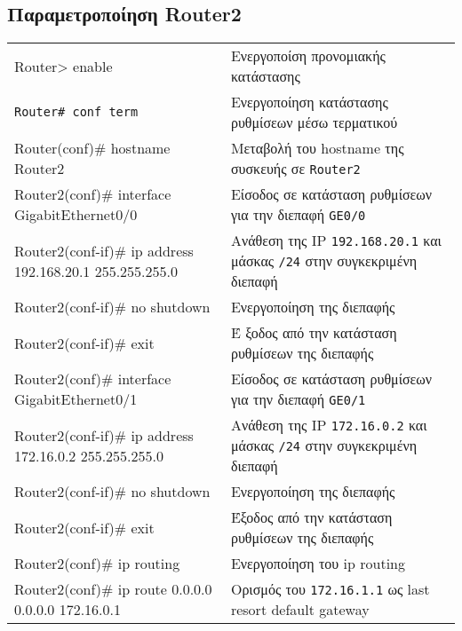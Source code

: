 \documentclass{EdipyLabsSolutions}
\begin{document}
\subsection*{Παραμετροποίηση Router2}
\begin{tabular}{>{\ttfamily}m{12cm}m{7cm}}
	Router> enable &Ενεργοποίση προνομιακής κατάστασης \\[0.25cm]
	\texttt{Router\# conf term} & Ενεργοποίηση κατάστασης ρυθμίσεων μέσω τερματικού\\[0.25cm]
	Router(conf)\# hostname Router2 & Μεταβολή του hostname της συσκευής σε \texttt{Router2}\\[0.25cm]
	Router2(conf)\# interface GigabitEthernet0/0 & Είσοδος σε κατάσταση ρυθμίσεων για την διεπαφή \texttt{GE0/0}\\[0.25cm]
	Router2(conf-if)\# ip address 192.168.20.1 255.255.255.0 & Ανάθεση της IP \texttt{192.168.20.1} και μάσκας \texttt{/24} στην συγκεκριμένη διεπαφή\\[0.25cm]
	Router2(conf-if)\# no shutdown & Ενεργοποίηση της διεπαφής\\[0.25cm]
	Router2(conf-if)\# exit &Έ ξοδος από την κατάσταση ρυθμίσεων της διεπαφής\\[0.25cm]
	Router2(conf)\# interface GigabitEthernet0/1 & Είσοδος σε κατάσταση ρυθμίσεων για την διεπαφή \texttt{GE0/1} \\[0.25cm]
	Router2(conf-if)\# ip address 172.16.0.2 255.255.255.0 & Ανάθεση της IP \texttt{172.16.0.2} και μάσκας \texttt{/24} στην συγκεκριμένη διεπαφή\\[0.25cm]
	Router2(conf-if)\# no shutdown & Ενεργοποίηση της διεπαφής\\[0.25cm]
	Router2(conf-if)\# exit & Έξοδος από την κατάσταση ρυθμίσεων της διεπαφής\\[0.25cm]
	Router2(conf)\# ip routing & Ενεργοποίηση του ip routing\\[0.25cm]
	Router2(conf)\# ip route 0.0.0.0 0.0.0.0 172.16.0.1 &  Ορισμός του \texttt{172.16.1.1} ως last resort default gateway
\end{tabular}
\end{document}
